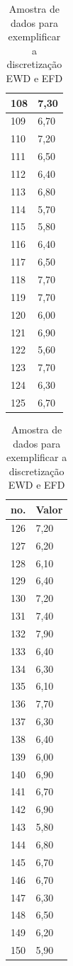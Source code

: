 \begin{table}[!ht]
\begin{tabular}{ |l|l| }
108	&	7,30	\\ \hline
109	&	6,70	\\ \hline
110	&	7,20	\\ \hline
111	&	6,50	\\ \hline
112	&	6,40	\\ \hline
113	&	6,80	\\ \hline
114	&	5,70	\\ \hline
115	&	5,80	\\ \hline
116	&	6,40	\\ \hline
117	&	6,50	\\ \hline
118	&	7,70	\\ \hline
119	&	7,70	\\ \hline
120	&	6,00	\\ \hline
121	&	6,90	\\ \hline
122	&	5,60	\\ \hline
123	&	7,70	\\ \hline
124	&	6,30	\\ \hline
125	&	6,70	\\ \hline
\end{tabular}
\begin{tabular}{ |l|l| }
\hline
 no. & Valor \\ \hline
126	&	7,20	\\ \hline
127	&	6,20	\\ \hline
128	&	6,10	\\ \hline
129	&	6,40	\\ \hline
130	&	7,20	\\ \hline
131	&	7,40	\\ \hline
132	&	7,90	\\ \hline
133	&	6,40	\\ \hline
134	&	6,30	\\ \hline
135	&	6,10	\\ \hline
136	&	7,70	\\ \hline
137	&	6,30	\\ \hline
138	&	6,40	\\ \hline
139	&	6,00	\\ \hline
140	&	6,90	\\ \hline
141	&	6,70	\\ \hline
142	&	6,90	\\ \hline
143	&	5,80	\\ \hline
144	&	6,80	\\ \hline
145	&	6,70	\\ \hline
146	&	6,70	\\ \hline
147	&	6,30	\\ \hline
148	&	6,50	\\ \hline
149	&	6,20	\\ \hline
150	&	5,90	\\ \hline

\end{tabular}
\caption{Amostra de dados para exemplificar a discretização EWD e EFD}
\label{tab:amostraDiscret}
\end{table}


